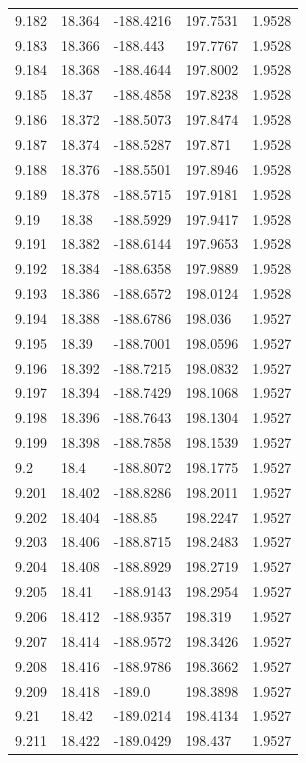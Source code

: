 \begin{tabular}{lllll}
9.182 & 18.364 & -188.4216 & 197.7531 & 1.9528 \\
9.183 & 18.366 & -188.443 & 197.7767 & 1.9528 \\
9.184 & 18.368 & -188.4644 & 197.8002 & 1.9528 \\
9.185 & 18.37 & -188.4858 & 197.8238 & 1.9528 \\
9.186 & 18.372 & -188.5073 & 197.8474 & 1.9528 \\
9.187 & 18.374 & -188.5287 & 197.871 & 1.9528 \\
9.188 & 18.376 & -188.5501 & 197.8946 & 1.9528 \\
9.189 & 18.378 & -188.5715 & 197.9181 & 1.9528 \\
9.19 & 18.38 & -188.5929 & 197.9417 & 1.9528 \\
9.191 & 18.382 & -188.6144 & 197.9653 & 1.9528 \\
9.192 & 18.384 & -188.6358 & 197.9889 & 1.9528 \\
9.193 & 18.386 & -188.6572 & 198.0124 & 1.9528 \\
9.194 & 18.388 & -188.6786 & 198.036 & 1.9527 \\
9.195 & 18.39 & -188.7001 & 198.0596 & 1.9527 \\
9.196 & 18.392 & -188.7215 & 198.0832 & 1.9527 \\
9.197 & 18.394 & -188.7429 & 198.1068 & 1.9527 \\
9.198 & 18.396 & -188.7643 & 198.1304 & 1.9527 \\
9.199 & 18.398 & -188.7858 & 198.1539 & 1.9527 \\
9.2 & 18.4 & -188.8072 & 198.1775 & 1.9527 \\
9.201 & 18.402 & -188.8286 & 198.2011 & 1.9527 \\
9.202 & 18.404 & -188.85 & 198.2247 & 1.9527 \\
9.203 & 18.406 & -188.8715 & 198.2483 & 1.9527 \\
9.204 & 18.408 & -188.8929 & 198.2719 & 1.9527 \\
9.205 & 18.41 & -188.9143 & 198.2954 & 1.9527 \\
9.206 & 18.412 & -188.9357 & 198.319 & 1.9527 \\
9.207 & 18.414 & -188.9572 & 198.3426 & 1.9527 \\
9.208 & 18.416 & -188.9786 & 198.3662 & 1.9527 \\
9.209 & 18.418 & -189.0 & 198.3898 & 1.9527 \\
9.21 & 18.42 & -189.0214 & 198.4134 & 1.9527 \\
9.211 & 18.422 & -189.0429 & 198.437 & 1.9527 \\

\end{tabular}
